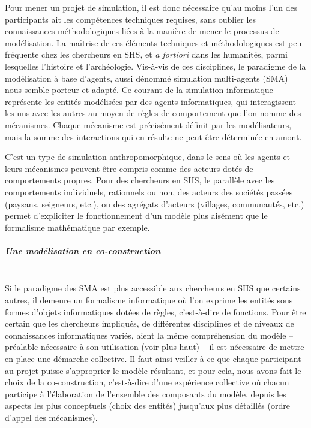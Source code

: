 Pour mener un projet de simulation, il est donc nécessaire qu'au moins l'un des participants ait les compétences techniques requises, sans oublier les connaissances méthodologiques liées à la manière de mener le processus de modélisation.
La maîtrise de ces éléments techniques et méthodologiques est peu fréquente chez les chercheurs en SHS, et \textit{a fortiori} dans les humanités, parmi lesquelles l'histoire et l'archéologie.
Vis-à-vis de ces disciplines, le paradigme de la modélisation à base d'agents, aussi dénommé \og simulation multi-agents\fg{} (SMA) nous semble porteur et adapté.
Ce courant de la simulation informatique représente les entités modélisées par des agents informatiques, qui interagissent les uns avec les autres au moyen de \og règles de comportement\fg{} que l'on nomme des mécanismes.
Chaque mécanisme est précisément définit par les modélisateurs, mais la somme des interactions qui en résulte ne peut être déterminée en amont.

C'est un type de simulation anthropomorphique, dans le sens où les agents et leurs mécanismes peuvent être compris comme des acteurs dotés de comportements propres.
Pour des chercheurs en SHS, le parallèle avec les comportements individuels, rationnels ou non, des acteurs des sociétés passées (paysans, seigneurs, etc.), ou des agrégats d'acteurs (villages, communautés, etc.) permet d'expliciter le fonctionnement d'un modèle plus aisément que le formalisme mathématique par exemple.

\subparagraph{Une modélisation en co-construction}~\\
Si le paradigme des SMA est plus accessible aux chercheurs en SHS que certains autres, il demeure un formalisme informatique où l'on exprime les entités sous formes d'objets informatiques dotées de règles, c'est-à-dire de fonctions.
Pour être certain que les chercheurs impliqués, de différentes disciplines et de niveaux de connaissances informatiques variés, aient la même compréhension du modèle -- préalable nécessaire à son utilisation (voir plus haut) -- il est nécessaire de mettre en place une démarche collective.
Il faut ainsi veiller à ce que chaque participant au projet puisse s'approprier le modèle résultant, et pour cela, nous avons fait le choix de la \og co-construction\fg{}, c'est-à-dire d'une expérience collective où chacun participe à l'élaboration de l'ensemble des composants du modèle, depuis les aspects les plus conceptuels (choix des entités) jusqu'aux plus détaillés (ordre d'appel des mécanismes).

